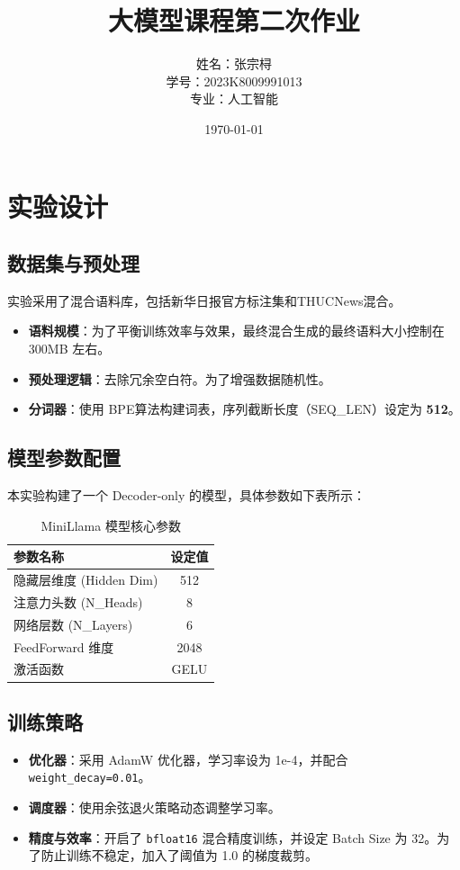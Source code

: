 \documentclass[a4paper,12pt]{ctexart} %
\title{\textbf{大模型课程第二次作业}}
\author{姓名：张宗桪 \\ 学号：2023K8009991013 \\ 专业：人工智能}
\date{\today}
\begin{document}
\pagestyle{plain} %

\maketitle
\thispagestyle{empty} %
\newpage

\tableofcontents
\newpage
\section{实验设计}
\subsection{数据集与预处理}
实验采用了混合语料库，包括新华日报官方标注集和THUCNews混合。
\begin{itemize}
    \item \textbf{语料规模}：为了平衡训练效率与效果，最终混合生成的最终语料大小控制在 300MB 左右。
    \item \textbf{预处理逻辑}：去除冗余空白符。为了增强数据随机性。
    \item \textbf{分词器}：使用 BPE算法构建词表，序列截断长度（SEQ\_LEN）设定为 \textbf{512}。
\end{itemize}

\subsection{模型参数配置}
本实验构建了一个 Decoder-only 的模型，具体参数如下表所示：

\begin{table}[H]
    \centering
    \caption{MiniLlama 模型核心参数}
    \begin{tabular}{lc}
        \toprule
        参数名称 & 设定值 \\
        \midrule
        隐藏层维度 (Hidden Dim) & 512 \\
        注意力头数 (N\_Heads) & 8 \\
        网络层数 (N\_Layers) & 6 \\
        FeedForward 维度 & 2048 \\
        激活函数 & GELU \\
        \bottomrule
    \end{tabular}
\end{table}

\subsection{训练策略}
\begin{itemize}
    \item \textbf{优化器}：采用 AdamW 优化器，学习率设为 1e-4，并配合 \texttt{weight\_decay=0.01}。
    \item \textbf{调度器}：使用余弦退火策略动态调整学习率。
    \item \textbf{精度与效率}：开启了 \texttt{bfloat16} 混合精度训练，并设定 Batch Size 为 32。为了防止训练不稳定，加入了阈值为 1.0 的梯度裁剪。
\end{itemize}
\end{document}
